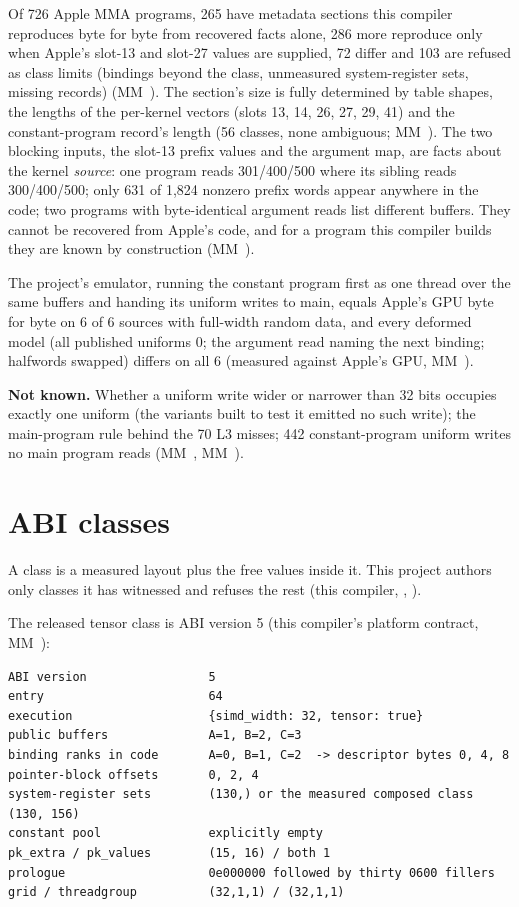 Of 726 Apple MMA programs, 265 have metadata sections this compiler reproduces byte for byte from recovered facts alone,
286 more reproduce only when Apple's slot-13 and slot-27 values are supplied, 72 differ and 103 are
refused as class limits (bindings beyond the class, unmeasured system-register sets, missing records) (MM~). The
section's size is fully determined by table shapes, the lengths of the per-kernel vectors (slots 13, 14, 26, 27, 29, 41)
and the constant-program record's length (56 classes, none ambiguous; MM~). The two blocking inputs, the slot-13
prefix values and the argument map, are facts about the kernel \emph{source}: one program reads 301/400/500 where its sibling
reads 300/400/500; only 631 of 1,824 nonzero prefix words appear anywhere in the code; two programs with byte-identical
argument reads list different buffers. They cannot be recovered from Apple's code, and for a program this compiler builds
they are known by construction (MM~).

The project's emulator, running the constant program first as one thread over the same buffers and handing
its uniform writes to main, equals Apple's GPU byte for byte on 6 of 6 sources with full-width random data, and every
deformed model (all published uniforms 0; the argument read naming the next binding; halfwords swapped) differs on all 6
(measured against Apple's GPU, MM~).

\textbf{Not known.} Whether a uniform write wider or narrower than 32 bits occupies exactly one uniform (the variants built to
test it emitted no such write); the main-program rule behind the 70 L3 misses; 442 constant-program uniform writes no
main program reads (MM~, MM~).

\section{ABI classes}\label{sec:abi-classes}

A class is a measured layout plus the free values inside it. This project authors only classes it has witnessed and
refuses the rest (this compiler, , ).

The released tensor class is ABI version 5 (this compiler's platform contract, MM~):

\begin{lstlisting}
ABI version                 5
entry                       64
execution                   {simd_width: 32, tensor: true}
public buffers              A=1, B=2, C=3
binding ranks in code       A=0, B=1, C=2  -> descriptor bytes 0, 4, 8
pointer-block offsets       0, 2, 4
system-register sets        (130,) or the measured composed class (130, 156)
constant pool               explicitly empty
pk_extra / pk_values        (15, 16) / both 1
prologue                    0e000000 followed by thirty 0600 fillers
grid / threadgroup          (32,1,1) / (32,1,1)
\end{lstlisting}

